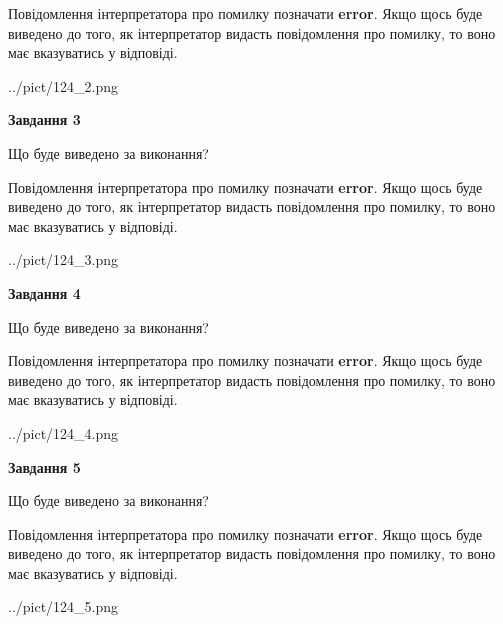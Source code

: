 \documentclass[12pt, ukrainian]{article}
\begin{document}
{\begin {large}
Повідомлення інтерпретатора про помилку позначати \textbf{error}.
Якщо щось буде виведено до того, як інтерпретатор видасть повідомлення про помилку, 
то воно має вказуватись у відповіді. \par


\begin{center}
	{../pict/124_2.png}
\end{center}
\newpage

{\begin {center}\textbf{Завдання 3}\end {center}}\par
Що буде виведено за виконання?

Повідомлення інтерпретатора про помилку позначати \textbf{error}.
Якщо щось буде виведено до того, як інтерпретатор видасть повідомлення про помилку, 
то воно має вказуватись у відповіді. \par


\begin{center}
	{../pict/124_3.png}
\end{center}
\newpage

{\begin {center}\textbf{Завдання 4}\end {center}}\par
Що буде виведено за виконання?

Повідомлення інтерпретатора про помилку позначати \textbf{error}.
Якщо щось буде виведено до того, як інтерпретатор видасть повідомлення про помилку, 
то воно має вказуватись у відповіді. \par


\begin{center}
	{../pict/124_4.png}
\end{center}
\newpage

{\begin {center}\textbf{Завдання 5}\end {center}}\par
Що буде виведено за виконання?

Повідомлення інтерпретатора про помилку позначати \textbf{error}.
Якщо щось буде виведено до того, як інтерпретатор видасть повідомлення про помилку, 
то воно має вказуватись у відповіді. \par


\begin{center}
	{../pict/124_5.png}
\end{center}
\newpage


\end{large}}
\end{document}
